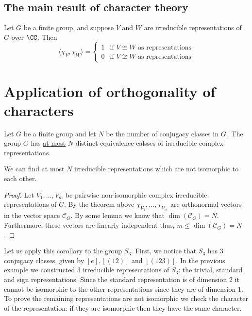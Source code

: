 \documentclass[12pt, a4paper]{article}
\begin{document}
\subsection{The main result of character theory}

\begin{mdthm}
    Let \(G\) be a finite group, and suppose \(V\) and \(W\) are irreducible representations of \(G\) over \(\CC\). Then 
    \[\langle \chi_V, \chi_W \rangle = \begin{cases}
        1 &\text{if } V \cong W \text{ as representations} \\
        0 &\text{if } V \not\cong W \text{ as representations}
    \end{cases}\]
\end{mdthm}

\begin{mdexample}
\end{mdexample}

\section{Application of orthogonality of characters}

\begin{mdcor}
    Let \(G\) be a finite group and let \(N\) be the number of conjugacy classes in \(G\).\ The group \(G\) has \ul{at most} \(N\) distinct equivalence calsses of irreducible complex representations.
\end{mdcor}

\begin{mdnote}
    We can find at most \(N\) irreducible representations which are not isomorphic to each other.
\end{mdnote}

\begin{proof}
    Let \(V_1,\ldots,V_m\) be pairwise non-isomorphic complex irreducible representations of \(G\). By the theorem above \(\chi_{V_1},\ldots,\chi_{V_m}\) are orthonormal vectors in the vector space \(\mathcal{C}_G\). By some lemma we know that \(\dim(\mathcal{C}_G) = N\). Furthermore, these vectors are linearly independent thus, \(m\leq \dim(\mathcal{C}_G)=N\).
\end{proof}

\begin{mdexample}
    Let us apply this corollary to the group \(S_3\). First, we notice that \(S_3\) has \(3\) conjugacy classes, given by \([e],[(12)]\) and \([(123)]\). In the previous example we constructed \(3\) irreducible representations of \(S_3\): the trivial, standard and sign representations. Since the standard representation is of dimension \(2\) it cannot be isomorphic to the other representations since they are of dimension \(1\). To prove the remaining representations are not isomorphic we check the character of the representation: if they are isomorphic then they have the same character.
\end{mdexample}
\end{document}
